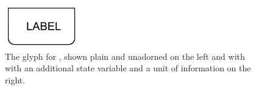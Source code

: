 \begin{figure}[H]
  \centering
  \includegraphics[width = 1.25in]{images/genetic-plain} \hspace*{2em}
  \caption{The \PD glyph for , shown plain and
    unadorned on the left and with with an additional state variable and a
    unit of information on the right.} 
  \label{fig:genetic}
\end{figure}

